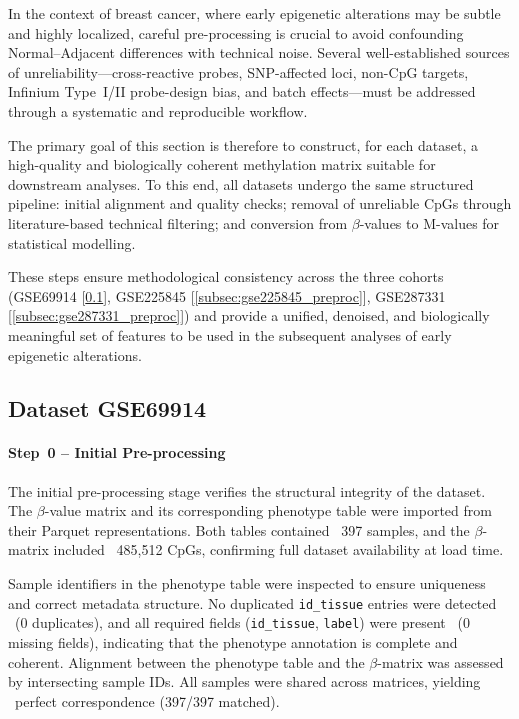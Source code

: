 \documentclass[10pt]{extarticle}
\newcommand{\good}[1]{\textcolor{teal!70!black}{\ding{51}~#1}}
\begin{document}
In the context of breast cancer, where early epigenetic alterations may be subtle and highly localized, careful
pre-processing is crucial to avoid confounding Normal–Adjacent differences with technical noise. Several well-established
sources of unreliability—cross-reactive probes, SNP-affected loci, non-CpG targets, Infinium Type~I/II probe-design
bias, and batch effects—must be addressed through a systematic and reproducible workflow.  

The primary goal of this section is therefore to construct, for each dataset, a high-quality and biologically coherent
methylation matrix suitable for downstream analyses. To this end, all datasets undergo the same structured pipeline:
initial alignment and quality checks; removal of unreliable CpGs through literature-based technical filtering; and conversion
from $\beta$-values to M-values for statistical modelling.

These steps ensure methodological consistency across the three cohorts (GSE69914 [\ref{subsec:gse69914_preproc}], GSE225845 [\ref{subsec:gse225845_preproc}], GSE287331 [\ref{subsec:gse287331_preproc}]) and
provide a unified, denoised, and biologically meaningful set of features to be used in the subsequent analyses of early
epigenetic alterations.


\subsection{Dataset GSE69914}
\label{subsec:gse69914_preproc}


\paragraph{Step~0 -- Initial Pre-processing}
\label{par:gse69914_step0}

The initial pre-processing stage verifies the structural integrity of the dataset.
The $\beta$-value matrix and its corresponding phenotype table were imported from
their Parquet representations. Both tables contained \good{397 samples}, and the $\beta$-matrix included
\good{485{,}512 CpGs}, confirming full dataset availability at load time.

Sample identifiers in the phenotype table were inspected to ensure uniqueness and correct metadata structure. No
duplicated \texttt{id\_tissue} entries were detected \good{(0 duplicates)}, and all required fields (\texttt{id\_tissue}, \texttt{label})
were present \good{(0 missing fields)}, indicating that the phenotype annotation is complete and coherent. Alignment
between the phenotype table and the $\beta$-matrix was assessed by intersecting sample IDs. All samples were shared
across matrices, yielding \good{perfect correspondence (397/397 matched)}.
\end{document}
